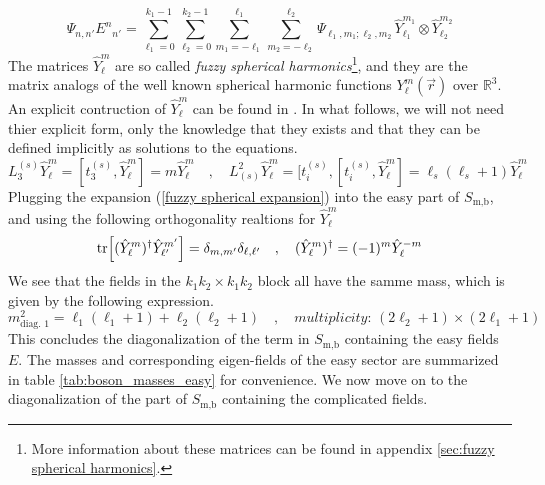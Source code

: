 %
%
\begin{equation}\label{fuzzy spherical expansion}
\Psi_{n,n'} {E^n}_{n'}
=
\sum_{\ell_1=0}^{k_1-1}
\sum_{\ell_2=0}^{k_2-1}
\sum_{m_1=-\ell_1}^{\ell_1}
\sum_{m_2=-\ell_2}^{\ell_2}
\Psi_{\ell_1,m_1;\ell_2,m_2} \,
\hat{Y}_{\ell_1}^{m_1} \otimes \hat{Y}_{\ell_2}^{m_2}
\end{equation}
%
%
The matrices $\hat{Y}_{\ell}^{m}$ are so called \textit{fuzzy spherical harmonics}\footnote{More information about these matrices can be found in appendix \ref{sec:fuzzy spherical harmonics}.}, and they are the matrix analogs of the well known spherical harmonic functions $Y_{\ell}^{m}(\vec{r})$ over $\mathbb{R}^3$. An explicit contruction of $\hat{Y}_{\ell}^{m}$ can be found in \cite{Two-point functions in D5-D3}. In what follows, we will not need thier explicit form, only the knowledge that they exists and that they can be defined implicitly as solutions to the equations.
%
%
\begin{equation}\label{fuzzy spherical properties}
L_3^{(s)} \hat{Y}_{\ell}^{m} = [t_3^{(s)}, \hat{Y}_{\ell}^{m}]
= m \hat{Y}_{\ell}^{m}
%
\quad , \quad
%
L^2_{(s)} \hat{Y}_{\ell}^{m} = [t_i^{(s)}, [t_i^{(s)}, \hat{Y}_{\ell}^{m}]
= \ell_s (\ell_s + 1) \hat{Y}_{\ell}^{m}
\end{equation}
%
%
Plugging the expansion (\ref{fuzzy spherical expansion}) into the easy part of $S_{\text{m,b}}$, and using the following orthogonality realtions for $\hat{Y}_{\ell}^{m}$
%
%
\begin{equation}
\tr[ (\hat{Y}^{m}_{\ell})^\dagger \hat{Y}^{m'}_{\ell'}]
=
\delta_{m,m'} \delta_{\ell,\ell'}
%
\quad , \quad
%
(\hat{Y}^{m}_{\ell})^\dagger = (-1)^m \hat{Y}^{-m}_{\ell}
\end{equation}
%
%
We see that the fields in the $k_1 k_2 \times k_1 k_2$ block all have the samme mass, which is given by the following expression.
%
%
\begin{equation}
m^2_{\text{diag. 1}} = \ell_1 (\ell_1 + 1) + \ell_2 (\ell_2 + 1)
%
\quad , \quad
%
\textit{multiplicity: } (2 \ell_2 + 1) \times (2 \ell_1 + 1)
\end{equation}
%
%
This concludes the diagonalization of the term in $S_{\text{m,b}}$ containing the easy fields $E$. The masses and corresponding eigen-fields of the easy sector are summarized in table \ref{tab:boson_masses_easy} for convenience. We now move on to the diagonalization of the part of $S_{\text{m,b}}$ containing the complicated fields.
%
%
